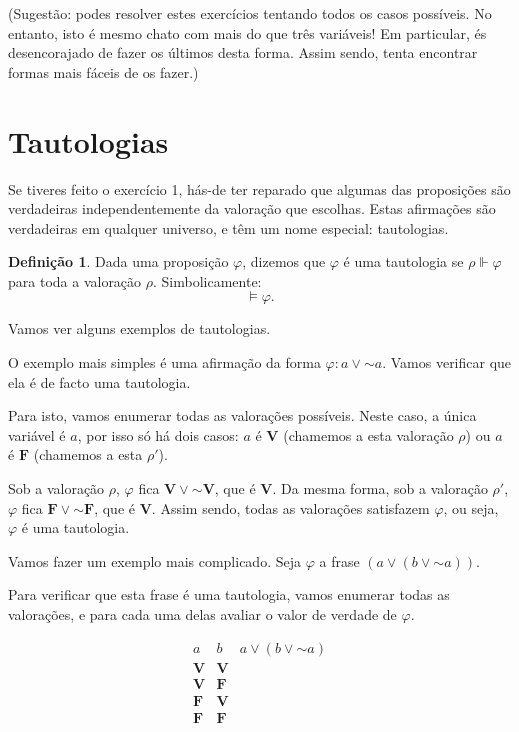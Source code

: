 \documentclass{article}
\theoremstyle{definition}
\newtheorem{definicao}{Definição}
\theoremstyle{remark}
\newcommand{\V}{\mathbf{V}}
\newcommand{\F}{\mathbf{F}}
\newcommand*{\lneg}{\mathord{\sim}}
\begin{document}
	(Sugestão: podes resolver estes exercícios tentando todos os casos possíveis. No entanto, isto é mesmo chato com mais do que três variáveis! Em particular, és desencorajado de fazer os últimos desta forma. Assim sendo, tenta encontrar formas mais fáceis de os fazer.)
	
	\section{Tautologias}
	
	Se tiveres feito o exercício 1, hás-de ter reparado que algumas das proposições são verdadeiras independentemente da valoração que escolhas. Estas afirmações são verdadeiras em qualquer universo, e têm um nome especial: tautologias.
	
	\begin{definicao}
	Dada uma proposição $\varphi$, dizemos que $\varphi$ é uma tautologia se $\rho \Vdash \varphi$ para toda a valoração $\rho$. Simbolicamente:
	\[\vDash \varphi.\]
	\end{definicao}
	
	Vamos ver alguns exemplos de tautologias.
	
	O exemplo mais simples é uma afirmação da forma $\varphi : a \lor \lneg a$. Vamos verificar que ela é de facto uma tautologia.
	
	Para isto, vamos enumerar todas as valorações possíveis. Neste caso, a única variável é $a$, por isso só há dois casos: $a$ é $\V$ (chamemos a esta valoração $\rho$) ou $a$ é $\F$ (chamemos a esta $\rho'$).
	
	Sob a valoração $\rho$, $\varphi$ fica $\V \lor \lneg \V$, que é $\V$. Da mesma forma, sob a valoração $\rho'$, $\varphi$ fica $\F \lor \lneg \F$, que é $\V$. Assim sendo, todas as valorações satisfazem $\varphi$, ou seja, $\varphi$ é uma tautologia.
	
	Vamos fazer um exemplo mais complicado. Seja $\varphi$ a frase $(a \lor (b \lor \lneg a))$.
	
	Para verificar que esta frase é uma tautologia, vamos enumerar todas as valorações, e para cada uma delas avaliar o valor de verdade de $\varphi$.
	
	\[
	\begin{array}{c|c|c}
	a & b & a \lor (b \lor \lneg a)\\
	\hline
	\V & \V &\\
	\V & \F &\\
	\F & \V &\\
	\F & \F &
	\end{array}
	\]
	
\end{document}
